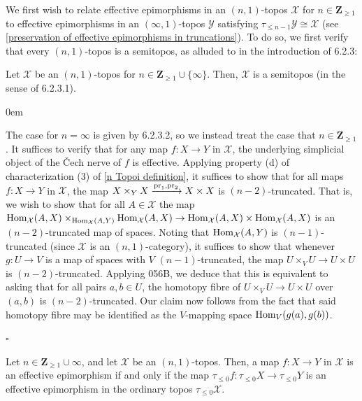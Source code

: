 \documentclass[10pt]{article}
\newcommand{\cX}{\mathcal{X}}
\newcommand{\cY}{\mathcal{Y}}
\newcommand{\ZZ}{\mathbb{Z}}
\def\ZZ{{\mathbf Z}}
\renewcommand{\qed}{\hfill$\square$}
\renewenvironment{proof}{\begin{addmargin}[1em]{0em}\begin{newproof}}{\end{newproof}\end{addmargin}\qed}
\theoremstyle{witharg}
\theoremstyle{witharg}
\theoremstyle{witharg2}
\begin{document}
\noindent We first wish to relate effective epimorphisms in an $(n,1)$-topos $\cX$ for $n\in \ZZ_{\geq 1}$ to effective epimorphisms in an $(\infty,1)$-topos $\cY$ satisfying $\tau_{\leq n-1}\cY\cong \cX$ (see \ref{preservation of effective epimorphisms in truncations}). To do so, we first verify that every $(n,1)$-topos is a semitopos, as alluded to in the introduction of  6.2.3:



\begin{lemma}{}\label{n-topoi are semitopoi}
    Let $\cX$ be an $(n,1)$-topos for $n\in \ZZ_{\geq 1}\cup \{\infty\}$. Then, $\cX$ is a semitopos (in the sense of  6.2.3.1).
\end{lemma}

\begin{proof}
    The case for $n=\infty$ is given by  6.2.3.2, so we instead treat the case that $n\in \ZZ_{\geq 1}$. It suffices to verify that for any map $f:X\rightarrow Y$ in $\cX$, the underlying simplicial object of the \v{C}ech nerve of $f$ is effective. Applying property (d) of characterization (3) of \ref{n Topoi definition}, it suffices to show that for all maps $f:X\rightarrow Y$ in $\cX$, the map $X\times_YX\xrightarrow{\textnormal{pr}_1,\textnormal{pr}_2} X\times X$ is $(n-2)$-truncated. That is, we wish to show that for all $A\in \cX$ the map $\textnormal{Hom}_\cX(A,X)\times_{\textnormal{Hom}_\cX(A,Y)}\textnormal{Hom}_\cX(A,X)\rightarrow \textnormal{Hom}_\cX(A,X)\times \textnormal{Hom}_\cX(A,X)$ is an $(n-2)$-truncated map of spaces. Noting that $\textnormal{Hom}_\cX(A,Y)$ is $(n-1)$-truncated (since $\cX$ is an $(n,1)$-category), it suffices to show that whenever $g:U\rightarrow V$ is a map of spaces with $V$ $(n-1)$-truncated, the map $U\times_VU\rightarrow U\times U$ is $(n-2)$-truncated. Applying  056B, we deduce that this is equivalent to asking that for all pairs $a,b\in U$, the homotopy fibre of $U\times_VU\rightarrow U\times U$ over $(a,b)$ is $(n-2)$-truncated. Our claim now follows from the fact that said homotopy fibre may be identified as the $V$-mapping space $\textnormal{Hom}_V(g(a),g(b))$.  

    
\end{proof}




\begin{corollary}{}\label{epis in n topoi}

     Let $n\in \ZZ_{\geq 1}\cup \infty$, and let $\cX$ be an $(n,1)$-topos. Then, a map $f:X\rightarrow Y$ in $\cX$ is an effective epimorphism if and only if the map $\tau_{\leq 0}f:\tau_{\leq 0}X\rightarrow \tau_{\leq 0}Y$ is an effective epimorphism in the ordinary topos $\tau_{\leq 0}\cX$.
    
\end{corollary}
   
\end{document}
